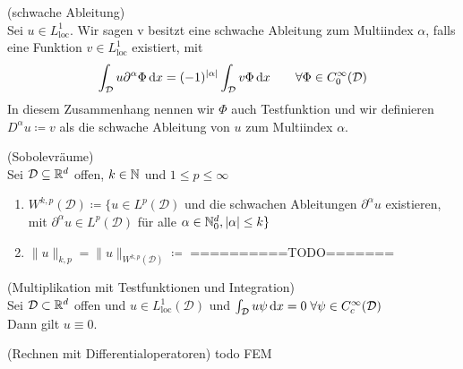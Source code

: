 \begin{Definition}(schwache Ableitung)\\
	Sei $u \in L_{\text{loc}}^1$. Wir sagen v besitzt eine schwache Ableitung zum Multiindex $\alpha$, falls eine Funktion $v \in L_{\text{loc}}^1$ existiert, mit 
		\begin{align*}
			\int_{\mathcal{D}} u \partial^{\alpha} \Phi \, \mathrm{d} x = (-1)^{|\alpha|} \int_{\mathcal{D}} v \Phi \, \mathrm{d} x \qquad \forall \Phi \in C_0^{\infty}(\mathcal{D})
		\end{align*}
	In diesem Zusammenhang nennen wir $\Phi$ auch Testfunktion und wir definieren $D^{\alpha} u \coloneqq v$ als die schwache Ableitung von $u$ zum Multiindex $\alpha$. 
\end{Definition}
\begin{Definition}(Sobolevräume)\\
	Sei $\mathcal{D} \subseteq \mathbb{R}^d $ offen, $ k \in \mathbb{N} $ und $ 1 \leq p \leq \infty $ 
	\begin{enumerate}[label=(\alph*)]
		\item $ W^{k,p} (\mathcal{D}) \coloneqq \{ u \in L^p(\mathcal{D})$ und die schwachen Ableitungen $ \partial^{\alpha}u $ existieren, mit $ \partial^{\alpha}u \in L^p(\mathcal{D}) $ für alle $ \alpha \in \mathbb{N}_0^d , |\alpha| \leq k \} $
		\item $ \lVert u \rVert_{k,p} =  \lVert u \rVert_{W^{k,p}(\mathcal{D})} \coloneqq  $ ==========TODO=======
	\end{enumerate}
\end{Definition}

\begin{Satz}(Multiplikation mit Testfunktionen und Integration) \\
	Sei $\mathcal{D} \subset \mathbb{R}^d$ offen und $u \in L_{\text{loc}}^1(\mathcal{D})$ und $\int_{\mathcal{D}} u \psi \, \mathrm{d} x = 0 \; \forall \psi \in C_c^{\infty}(\mathcal{D})$ \\
	Dann gilt $ u \equiv 0 $.
\end{Satz}
\begin{Satz} (Rechnen mit Differentialoperatoren)
	todo FEM
\end{Satz}